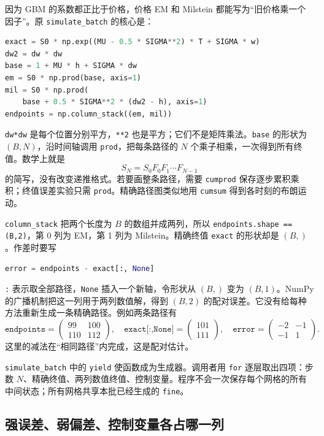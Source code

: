 因为 GBM 的系数都正比于价格，价格 EM 和 Milstein 都能写为“旧价格乘一个因子”。原 \texttt{simulate\_batch} 的核心是：
\begin{lstlisting}[language=Python]
exact = S0 * np.exp((MU - 0.5 * SIGMA**2) * T + SIGMA * w)
dw2 = dw * dw
base = 1 + MU * h + SIGMA * dw
em = S0 * np.prod(base, axis=1)
mil = S0 * np.prod(
    base + 0.5 * SIGMA**2 * (dw2 - h), axis=1)
endpoints = np.column_stack((em, mil))
\end{lstlisting}
\texttt{dw*dw} 是每个位置分别平方，\texttt{**2} 也是平方；它们不是矩阵乘法。\texttt{base} 的形状为 $(B,N)$，沿时间轴调用 \texttt{prod}，把每条路径的 $N$ 个乘子相乘，一次得到所有终值。数学上就是
\[
S_N=S_0F_0F_1\cdots F_{N-1}
\]
的简写，没有改变递推格式。若要画整条路径，需要 \texttt{cumprod} 保存逐步累积乘积；终值误差实验只需 \texttt{prod}。精确路径图类似地用 \texttt{cumsum} 得到各时刻的布朗运动。

\texttt{column\_stack} 把两个长度为 $B$ 的数组并成两列，所以 \texttt{endpoints.shape == (B,2)}，第 0 列为 EM，第 1 列为 Milstein。精确终值 \texttt{exact} 的形状却是 $(B,)$。作差时要写
\begin{lstlisting}[language=Python]
error = endpoints - exact[:, None]
\end{lstlisting}
\texttt{:} 表示取全部路径，\texttt{None} 插入一个新轴，令形状从 $(B,)$ 变为 $(B,1)$。NumPy 的广播机制把这一列用于两列数值解，得到 $(B,2)$ 的配对误差。它没有给每种方法重新生成一条精确路径。例如两条路径有
\[
\texttt{endpoints}=\begin{pmatrix}99&100\\110&112\end{pmatrix},
\quad \texttt{exact[:,None]}=\begin{pmatrix}101\\111\end{pmatrix},
\quad \texttt{error}=\begin{pmatrix}-2&-1\\-1&1\end{pmatrix}.
\]
这里的减法在“相同路径”内完成，这是配对估计。

\texttt{simulate\_batch} 中的 \texttt{yield} 使函数成为生成器。调用者用 \texttt{for} 逐层取出四项：步数 $N$、精确终值、两列数值终值、控制变量。程序不会一次保存每个网格的所有中间状态；所有网格共享本批已经生成的 \texttt{fine}。

\subsection{强误差、弱偏差、控制变量各占哪一列}

